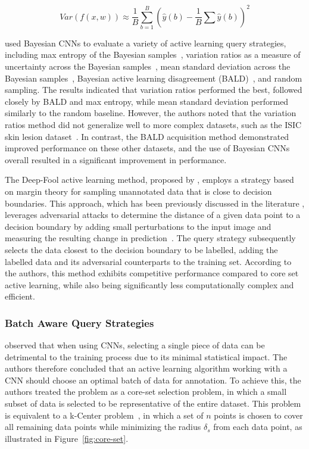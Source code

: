 \begin{equation}
	Var(f(x, w))\approx\frac{1}{B}\sum^B_{b=1}\left(\widehat{y}(b)-\frac{1}{B}\sum\widehat{y}(b)\right)^2
	\label{eq:bayesian_cnn}
\end{equation}

\cite{gal2017deep} used Bayesian CNNs to evaluate a variety of active learning query strategies, including max entropy of the Bayesian samples~\citep{shin1949mathematical}, variation ratios as a measure of uncertainty across the Bayesian samples~\citep{freeman1965elementary}, mean standard deviation across the Bayesian samples~\citep{kampffmeyer2016semantic}, Bayesian active learning disagreement (BALD)~\citep{houlsby2011bayesian}, and random sampling. The results indicated that variation ratios performed the best, followed closely by BALD and max entropy, while mean standard deviation performed similarly to the random baseline. However, the authors noted that the variation ratios method did not generalize well to more complex datasets, such as the ISIC skin lesion dataset~\citep{gutman2016skin}. In contrast, the BALD acquisition method demonstrated improved performance on these other datasets, and the use of Bayesian CNNs overall resulted in a significant improvement in performance.

The Deep-Fool active learning method, proposed by \cite{ducoffe2018adversarial}, employs a strategy based on margin theory for sampling unannotated data that is close to decision boundaries. This approach, which has been previously discussed in the literature \cite{settles2012active}, leverages adversarial attacks to determine the distance of a given data point to a decision boundary by adding small perturbations to the input image and measuring the resulting change in prediction~\citep{kurakin2016adversarial}. The query strategy subsequently selects the data closest to the decision boundary to be labelled, adding the labelled data and its adversarial counterparts to the training set.  According to the authors, this method exhibits competitive performance compared to core set active learning, while also being significantly less computationally complex and efficient.

\subsubsection{Batch Aware Query Strategies}
\cite{sener2017active} observed that when using CNNs, selecting a single piece of data can be detrimental to the training process due to its minimal statistical impact. The authors therefore concluded that an active learning algorithm working with a CNN should choose an optimal batch of data for annotation. To achieve this, the authors treated the problem as a core-set selection problem, in which a small subset of data is selected to be representative of the entire dataset. This problem is equivalent to a k-Center problem~\citep{farahani2009facility}, in which a set of $n$ points is chosen to cover all remaining data points while minimizing the radius $\delta_s$ from each data point, as illustrated in Figure~\ref{fig:core-set}.

